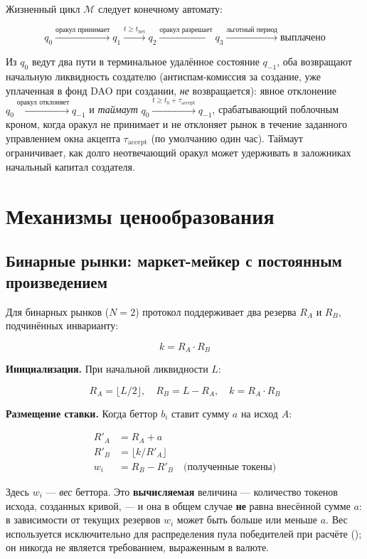 \documentclass{ledger}
\theoremstyle{plain}
\theoremstyle{remark}
\begin{document}
Жизненный цикл $\mathcal{M}$ следует конечному автомату:

\[
q_0 \xrightarrow{\text{оракул принимает}} q_1 \xrightarrow{t \geq t_{\text{bet}}}
q_2 \xrightarrow{\text{оракул разрешает}} q_3 \xrightarrow{\text{льготный период}}
\text{выплачено}
\]

Из $q_0$ ведут два пути в терминальное удалённое состояние $q_{-1}$, оба возвращают
начальную ликвидность создателю (антиспам-комиссия за создание, уже уплаченная в
фонд DAO при создании, \emph{не} возвращается): явное отклонение
$q_0 \xrightarrow{\text{оракул отклоняет}} q_{-1}$ и \emph{таймаут}
$q_0 \xrightarrow{t \geq t_0 + \tau_{\text{accept}}} q_{-1}$, срабатывающий
поблочным кроном, когда оракул не принимает и не отклоняет рынок в течение
заданного управлением окна акцепта $\tau_{\text{accept}}$ (по умолчанию один час).
Таймаут ограничивает, как долго неотвечающий оракул может удерживать в заложниках
начальный капитал создателя.

\section{Механизмы ценообразования}\label{sec:pricing}

\subsection{Бинарные рынки: маркет-мейкер с постоянным произведением}

Для бинарных рынков ($N = 2$) протокол поддерживает два резерва $R_A$ и $R_B$,
подчинённых инварианту:

\[
k = R_A \cdot R_B
\]

\textbf{Инициализация.} При начальной ликвидности $L$:

\[
R_A = \lfloor L / 2 \rfloor, \quad R_B = L - R_A, \quad k = R_A \cdot R_B
\]

\textbf{Размещение ставки.} Когда беттор $b_i$ ставит сумму $a$ на исход $A$:

\begin{align*}
R'_A &= R_A + a \\
R'_B &= \lfloor k / R'_A \rfloor \\
w_i  &= R_B - R'_B \quad \text{(полученные токены)}
\end{align*}

Здесь $w_i$ --- \emph{вес} беттора. Это \textbf{вычисляемая} величина --- количество
токенов исхода, созданных кривой, --- и она в общем случае \textbf{не} равна
внесённой сумме $a$: в зависимости от текущих резервов $w_i$ может быть больше или
меньше $a$. Вес используется исключительно для распределения пула победителей при
расчёте (); он никогда не является требованием, выраженным в
валюте.
\end{document}
